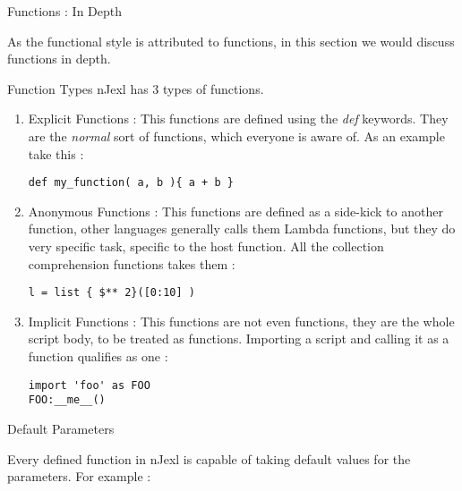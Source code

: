 \begin{section}{Functions : In Depth}

As the functional style is attributed to functions, in this section
we would discuss functions in depth.

\begin{subsection}{Function Types}
nJexl has 3 types of functions.
\begin{enumerate}
\item{Explicit Functions :
This functions are defined using the \emph{def} keywords.
They are the \emph{normal} sort of functions, which everyone is aware of.
As an example take this :

\begin{lstlisting}[style=JexlStyle]
def my_function( a, b ){ a + b }
\end{lstlisting}
}

\item{Anonymous Functions :
This functions are defined as a side-kick to another function, 
other languages generally calls them Lambda functions, but they do very specific 
task, specific to the host function. 
All the collection comprehension functions takes them :
\begin{lstlisting}[style=JexlStyle]
l = list { $** 2}([0:10] )
\end{lstlisting}
}

\item{Implicit Functions :
This functions are not even functions, they are the whole script body, 
to be treated as functions. Importing a script and calling it 
as a function qualifies as one : 
\begin{lstlisting}[style=JexlStyle]
import 'foo' as FOO
FOO:__me__()
\end{lstlisting}
}
\end{enumerate}

\end{subsection}

\begin{subsection}{Default Parameters}

Every defined function in nJexl is capable of taking default values
for the parameters. For example :


\end{subsection}
\end{section}
